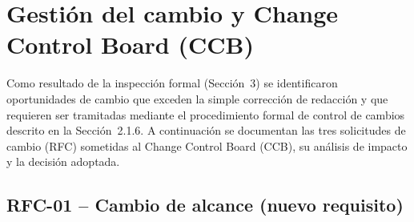 \documentclass[journal,onecolumn]{IEEEtran}
\begin{document}
	\newpage
\section{Gestión del cambio y Change Control Board (CCB)}

Como resultado de la inspección formal (Sección~3) se identificaron oportunidades de cambio que exceden la simple corrección de redacción y que requieren ser tramitadas mediante el procedimiento formal de control de cambios descrito en la Sección~2.1.6. A continuación se documentan las tres solicitudes de cambio (RFC) sometidas al Change Control Board (CCB), su análisis de impacto y la decisión adoptada.

\subsection{RFC-01 -- Cambio de alcance (nuevo requisito)}
\end{document}

